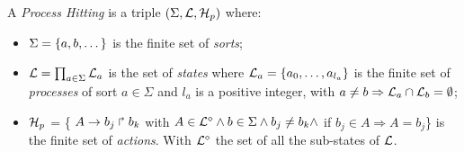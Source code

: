 \begin{definition}\label{def:PH}
  A \emph{Process Hitting} is a triple $(\Sigma,\mathcal{L},\mathcal{H}_p)$ where:
  \begin{itemize}
    \item  $\Sigma = \{a,b,\dots\}$ is the finite set of \emph{sorts};
    \item  $\mathcal{L} = \prod_{a\in\Sigma} \mathcal{L}_a$ is the set of \emph{states} where
      $\mathcal{L}_a = \{a_0,\dots,a_{l_a}\}$
      is the finite set of \emph{processes} of sort $a\in\Sigma$
      and $l_a$ is a positive integer, with $a\neq b\Rightarrow \mathcal{L}_a \cap \mathcal{L}_b = \emptyset$;
    \item $\mathcal{H}_p$ = \{ $A\rightarrow b_j\Rsh b_k$ with $A \in \mathcal{L}^{\diamond} \wedge b \in \Sigma \wedge b_j \neq b_k \wedge$ if $b_j \in A \Rightarrow A=b_j$\} is the finite set of \emph{actions}.
    With $\mathcal{L}^{\diamond}$ the set of all the sub-states of $\mathcal{L}$.    
  \end{itemize}
\end{definition}

